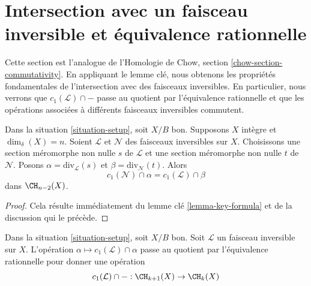 \section{Intersection avec un faisceau inversible et équivalence rationnelle}
\label{section-commutativity}

\noindent
Cette section est l'analogue de l'Homologie de Chow, section
\ref{chow-section-commutativity}. En appliquant le lemme clé, nous obtenons
les propriétés fondamentales de l'intersection avec des faisceaux inversibles.
En particulier, nous verrons que $c_1(\mathcal{L}) \cap -$ passe au quotient par
l'équivalence rationnelle et que les opérations associées à différents faisceaux inversibles
commutent.

\begin{lemma}
\label{lemma-commutativity-on-integral}
Dans la situation \ref{situation-setup}, soit $X/B$ bon. Supposons
$X$ intègre et $\dim_\delta(X) = n$. Soient $\mathcal{L}$ et $\mathcal{N}$ des faisceaux
inversibles sur $X$. Choisissons une section méromorphe non nulle $s$ de
$\mathcal{L}$ et une section méromorphe non nulle $t$ de $\mathcal{N}$. Posons
$\alpha = \text{div}_\mathcal{L}(s)$ et $\beta = \text{div}_\mathcal{N}(t)$.
Alors
$$
c_1(\mathcal{N}) \cap \alpha
=
c_1(\mathcal{L}) \cap \beta
$$
dans $\CH_{n - 2}(X)$.
\end{lemma}

\begin{proof}
Cela résulte immédiatement du lemme clé \ref{lemma-key-formula} et de la discussion qui le
précède.
\end{proof}

\begin{lemma}
\label{lemma-factors}
Dans la situation \ref{situation-setup}, soit $X/B$ bon. Soit
$\mathcal{L}$ un faisceau inversible sur $X$. L'opération $\alpha \mapsto c_1(\mathcal{L})
\cap \alpha$ passe au quotient par l'équivalence rationnelle pour donner une opération
$$
c_1(\mathcal{L}) \cap - : \CH_{k + 1}(X) \to \CH_k(X)
$$
\end{lemma}

